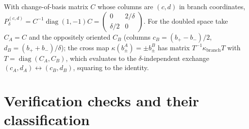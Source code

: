 \documentclass[11pt]{article}
\theoremstyle{definition}
\theoremstyle{remark}
\begin{document}
With change-of-basis matrix $C$ whose columns are $(c,d)$ in branch
coordinates, $P_\delta^{(c,d)}=C^{-1}\operatorname{diag}(1,-1)C
=\left(\begin{smallmatrix}0&2/\delta\\ \delta/2&0\end{smallmatrix}\right)$.
For the doubled space take $C_A=C$ and the oppositely oriented
$C_B$ (columns $c_B=(b_+-b_-)/2$, $d_B=(b_++b_-)/\delta$); the cross
map $\kappa(b_\pm^A)=\pm b_\pm^B$ has matrix
$T^{-1}\kappa_{\mathrm{branch}}T$ with $T=\operatorname{diag}(C_A,C_B)$,
which evaluates to the $\delta$-independent exchange
$(c_A,d_A)\leftrightarrow(c_B,d_B)$, squaring to the identity.

\section{Verification checks and their classification}
\label{app:checks}
\end{document}
